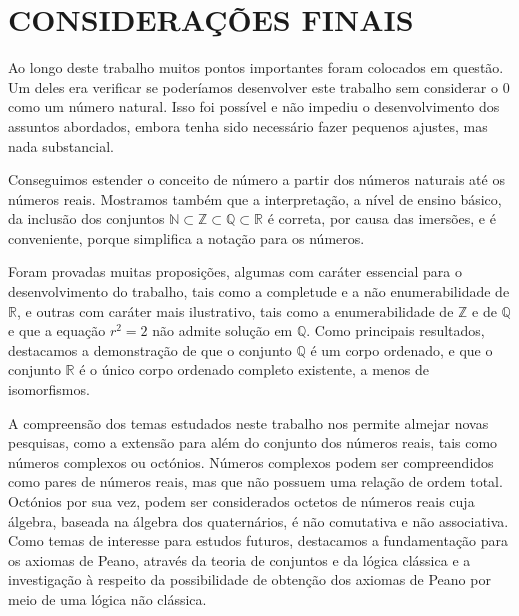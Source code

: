 \documentclass[../main.tex]{subfiles}
\begin{document}
\chapter*[Conclusão]{CONSIDERAÇÕES FINAIS}

Ao longo deste trabalho muitos pontos importantes foram colocados em questão. Um deles era verificar se poderíamos desenvolver este trabalho sem considerar o $0$ como um número natural. Isso foi possível e não impediu o desenvolvimento dos assuntos abordados, embora tenha sido necessário fazer pequenos ajustes, mas nada substancial. 

Conseguimos estender o conceito de número a partir dos números naturais até os números reais. Mostramos também que a interpretação, a nível de ensino básico, da inclusão dos conjuntos $\mathbb{N} \subset \mathbb{Z} \subset \mathbb{Q} \subset \mathbb{R}$ é correta, por causa das imersões, e é conveniente, porque simplifica a notação para os números. 

Foram provadas muitas proposições, algumas com caráter essencial para o desenvolvimento do trabalho, tais como a completude e a não enumerabilidade de $\mathbb{R}$, e outras com caráter mais ilustrativo, tais como a enumerabilidade de $\mathbb{Z}$ e de $\mathbb{Q}$ e que a equação $r^2 = 2$ não admite solução em $\mathbb{Q}$. Como principais resultados, destacamos a demonstração de que o conjunto $\mathbb{Q}$ é um corpo ordenado, e que o conjunto $\mathbb{R}$ é o único corpo ordenado completo existente, a menos de isomorfismos.

A compreensão dos temas estudados neste trabalho nos permite almejar novas pesquisas, como a extensão para além do conjunto dos números reais, tais como números complexos ou octónios. Números complexos podem ser compreendidos como pares de números reais, mas que não possuem uma relação de ordem total. Octónios por sua vez, podem ser considerados octetos de números reais cuja álgebra, baseada na álgebra dos quaternários, é não comutativa e não associativa.
Como temas de interesse para estudos futuros, destacamos a fundamentação para os axiomas de Peano, através da teoria de conjuntos e da lógica clássica e a investigação à respeito da possibilidade de obtenção dos axiomas de Peano por meio de uma lógica não clássica.
\end{document}
